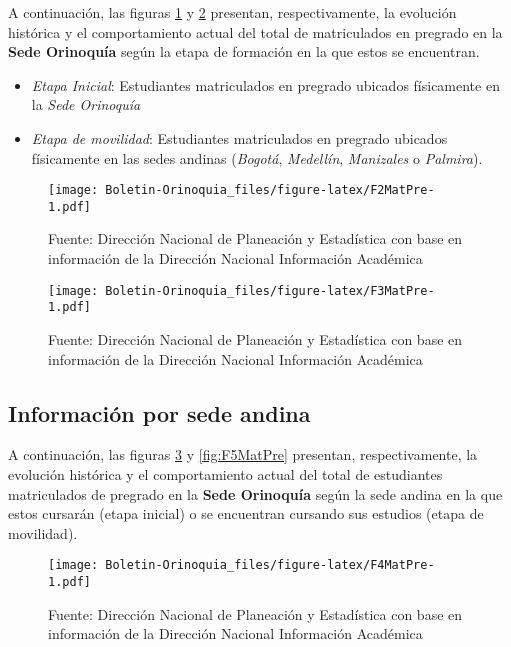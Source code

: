 \documentclass[
]{book}
\begin{document}
A continuación, las figuras \ref{fig:F2MatPre} y \ref{fig:F3MatPre} presentan, respectivamente, la evolución histórica y el comportamiento actual del total de matriculados en pregrado en la \textbf{Sede Orinoquía} según la etapa de formación en la que estos se encuentran.

\begin{itemize}
\item
  \emph{Etapa Inicial}: Estudiantes matriculados en pregrado ubicados físicamente en la \emph{Sede Orinoquía}
\item
  \emph{Etapa de movilidad}: Estudiantes matriculados en pregrado ubicados físicamente en las sedes andinas (\emph{Bogotá}, \emph{Medellín}, \emph{Manizales} o \emph{Palmira}).
\end{itemize}

\begin{figure}
\centering
\texttt{[image: Boletin-Orinoquia\_files/figure-latex/F2MatPre-1.pdf]}
\caption{\label{fig:F2MatPre}Fuente: Dirección Nacional de Planeación y Estadística con base en información de la Dirección Nacional Información Académica}
\end{figure}

\begin{figure}
\centering
\texttt{[image: Boletin-Orinoquia\_files/figure-latex/F3MatPre-1.pdf]}
\caption{\label{fig:F3MatPre}Fuente: Dirección Nacional de Planeación y Estadística con base en información de la Dirección Nacional Información Académica}
\end{figure}

\hypertarget{informaciuxf3n-por-sede-andina}{%
\subsection{Información por sede andina}\label{informaciuxf3n-por-sede-andina}}

A continuación, las figuras \ref{fig:F4MatPre} y \ref{fig:F5MatPre} presentan, respectivamente, la evolución histórica y el comportamiento actual del total de estudiantes matriculados de pregrado en la \textbf{Sede Orinoquía} según la sede andina en la que estos cursarán (etapa inicial) o se encuentran cursando sus estudios (etapa de movilidad).

\begin{figure}
\centering
\texttt{[image: Boletin-Orinoquia\_files/figure-latex/F4MatPre-1.pdf]}
\caption{\label{fig:F4MatPre}Fuente: Dirección Nacional de Planeación y Estadística con base en información de la Dirección Nacional Información Académica}
\end{figure}
\end{document}

